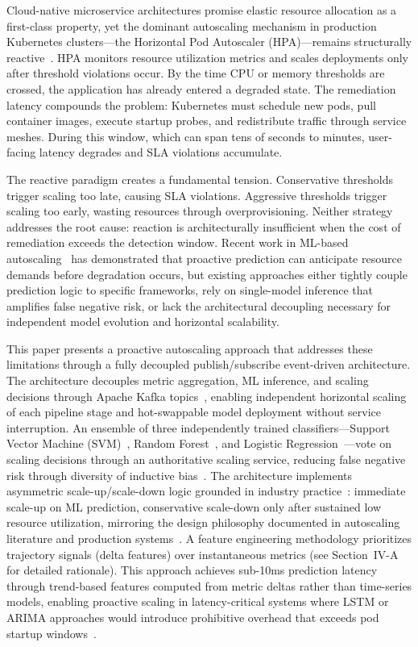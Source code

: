 \documentclass[conference]{IEEEtran}
\begin{document}
Cloud-native microservice architectures promise elastic resource allocation as a first-class property, yet the dominant autoscaling mechanism in production Kubernetes clusters---the Horizontal Pod Autoscaler (HPA)---remains structurally reactive~\cite{hasan2020horizontal}. HPA monitors resource utilization metrics and scales deployments only after threshold violations occur. By the time CPU or memory thresholds are crossed, the application has already entered a degraded state. The remediation latency compounds the problem: Kubernetes must schedule new pods, pull container images, execute startup probes, and redistribute traffic through service meshes. During this window, which can span tens of seconds to minutes, user-facing latency degrades and SLA violations accumulate.

The reactive paradigm creates a fundamental tension. Conservative thresholds trigger scaling too late, causing SLA violations. Aggressive thresholds trigger scaling too early, wasting resources through overprovisioning. Neither strategy addresses the root cause: reaction is architecturally insufficient when the cost of remediation exceeds the detection window. Recent work in ML-based autoscaling~\cite{pbscaler,firm,autopilot} has demonstrated that proactive prediction can anticipate resource demands before degradation occurs, but existing approaches either tightly couple prediction logic to specific frameworks, rely on single-model inference that amplifies false negative risk, or lack the architectural decoupling necessary for independent model evolution and horizontal scalability.

This paper presents a proactive autoscaling approach that addresses these limitations through a fully decoupled publish/subscribe event-driven architecture. The architecture decouples metric aggregation, ML inference, and scaling decisions through Apache Kafka topics~\cite{garg2023kafka}, enabling independent horizontal scaling of each pipeline stage and hot-swappable model deployment without service interruption. An ensemble of three independently trained classifiers---Support Vector Machine (SVM)~\cite{svm}, Random Forest~\cite{randomforest}, and Logistic Regression~\cite{sklearn}---vote on scaling decisions through an authoritative scaling service, reducing false negative risk through diversity of inductive bias~\cite{ensemble}. The architecture implements asymmetric scale-up/scale-down logic grounded in industry practice~\cite{lorido2014autoscaling}: immediate scale-up on ML prediction, conservative scale-down only after sustained low resource utilization, mirroring the design philosophy documented in autoscaling literature and production systems~\cite{autopilot}. A feature engineering methodology prioritizes trajectory signals (delta features) over instantaneous metrics (see Section~IV-A for detailed rationale). This approach achieves sub-10ms prediction latency through trend-based features computed from metric deltas rather than time-series models, enabling proactive scaling in latency-critical systems where LSTM or ARIMA approaches would introduce prohibitive overhead that exceeds pod startup windows~\cite{pbscaler}.
\end{document}
